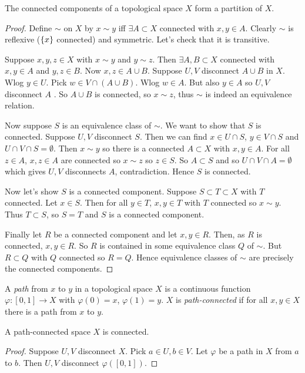 \begin{theorem} \label{thm:45}
The connected components of a topological space $X$ form a partition of $X$.
\end{theorem}

\begin{proof}
Define $\sim$ on $X$ by $x\sim y$ iff $\exists A\subset X$ connected with $x,y \in A$. Clearly $\sim$ is reflexive ($\{x\}$ connected) and symmetric. Let's check that it is transitive.

Suppose $x,y,z\in X$ with $x\sim y$ and $y\sim z$. Then $\exists A,B\subset X$ connected with $x,y\in A$ and $y,z\in B$. Now $x,z\in A\cup B$. Suppose $U,V$ disconnect $A\cup B$ in $X$. Wlog $y\in U$. Pick $w\in V\cap(A\cup B)$. Wlog $w\in A$. But also $y\in A$ so $U,V$ disconnect $A$ \Lightning.
So $A\cup B$ is connected, so $x\sim z$, thus $\sim$ is indeed an equivalence relation.

Now suppose $S$ is an equivalence class of $\sim$. We want to show that $S$ is connected. Suppose $U,V$ disconnect $S$. Then we can find $x\in U\cap S$, $y\in V\cap S$ and $U\cap V\cap S = \emptyset$. Then $x\sim y$ so there is a connected $A\subset X$ with $x,y\in A$. For all $z\in A$, $x,z\in A$ are connected so $x\sim z$ so $z\in S$. So $A\subset S$ and so $U\cap V\cap A = \emptyset$ which gives $U,V$ disconnects $A$, contradiction. Hence $S$ is connected.

Now let's show $S$ is a connected component. Suppose $S\subset T\subset X$ with $T$ connected. Let $x\in S$. Then for all $y\in T$, $x,y\in T$ with $T$ connected so $x\sim y$. Thus $T\subset S$, so $S=T$ and $S$ is a connected component.

Finally let $R$ be a connected component and let $x,y\in R$. Then, as $R$ is connected, $x,y\in R$. So $R$ is contained in some equivalence class $Q$ of $\sim$. But $R\subset Q$ with $Q$ connected so $R=Q$. Hence equivalence classes of $\sim$ are precisely the connected components.
\end{proof}

\begin{definition}
A \emph{path} from $x$ to $y$ in a topological space $X$ is a continuous function $\varphi:[0,1]\to X$ with $\varphi(0) = x$, $\varphi(1) = y$. $X$ is \emph{path-connected} if for all $x,y\in X$ there is a path from $x$ to $y$.
\end{definition}

\begin{proposition}                                     %
A path-connected space $X$ is connected.
\end{proposition}
\begin{proof}
Suppose $U,V$ disconnect $X$. Pick $a\in U, b\in V$. Let $\varphi$ be a path in $X$ from $a$ to $b$. Then $U,V$ disconnect $\varphi([0,1])$.
\end{proof}

